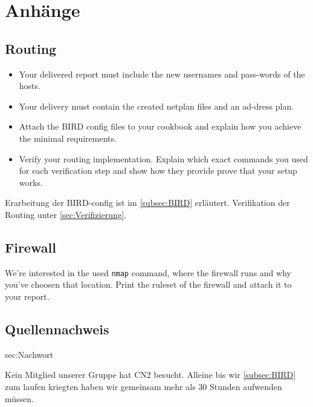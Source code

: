 \documentclass[11pt,titlepage]{article}
\newenvironment{shadedquotation}
 {\begin{shaded*}
  \quoting[leftmargin=0pt, vskip=0pt]
 }
 {\endquoting
 \end{shaded*}
}
\begin{document}
\section{Anhänge}
\label{sec:Anhänge}

\subsection{Routing}
\label{subsec:Routing}
\begin{shadedquotation}
  \begin{itemize}
    \item Your delivered report must include the new usernames and pass-words of the hosts.
    \item Your delivery must contain the created netplan files and an ad-dress plan.
    \item Attach the BIRD config files to your cookbook and explain how you achieve the minimal requirements.
    \item Verify your routing implementation. Explain which exact commands you used for each verification step and show how they provide prove that your setup works.
  \end{itemize}
\end{shadedquotation}
Erarbeitung der BIRD-config ist im \ref{subsec:BIRD} erläutert.
Verifikation der Routing unter \ref{sec:Verifizierung}.

\subsection{Firewall}
\label{subsec:Firewall}

\begin{shadedquotation}
  We’re interested in the used \lstinline!nmap! command, where the firewall runs and why you’ve choosen that location. Print the ruleset of the firewall and attach it to your report.
\end{shadedquotation}

\subsection{Quellennachweis}
\label{subsec:Quellennachweis}

\begingroup
\renewcommand{\section}[2]{}%


\endgroup  

\section{Nachwort}
\label{sec:Nachwort}

Kein Mitglied unserer Gruppe hat CN2 besucht. Alleine bis wir \ref{subsec:BIRD} zum laufen kriegten haben wir gemeinsam mehr als 30 Stunden aufwenden müssen. 
\end{document}
